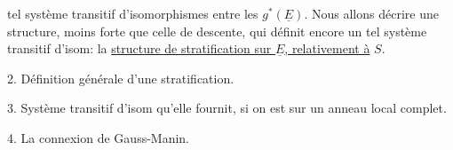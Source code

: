 tel système transitif d'isomorphismes entre les $g^*(\underline{E})$.
Nous allons décrire une structure,  moins forte que celle de descente, qui définit encore un tel système transitif d'isom: la \uline{structure de stratification sur $\underline{E}$, relativement à} $S$.

2. Définition générale d'une stratification.

3. Système transitif d'isom qu'elle fournit, si on est sur un anneau local complet.

4. La  connexion de Gauss-Manin.

